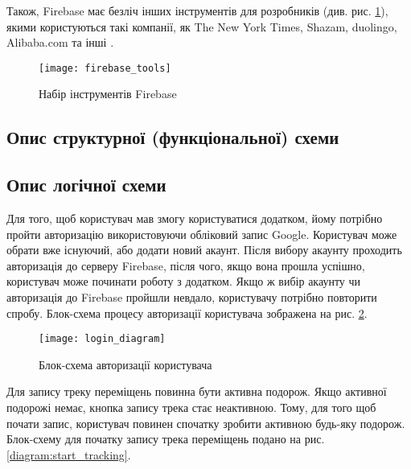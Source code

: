 \documentclass[../main.tex]{subfiles}
\begin{document}


Також, Firebase має безліч інших інструментів для розробників (див. рис. \ref{figure:firebase_tools}), якими користуються такі компанії, як The New York Times, Shazam, duolingo, Alibaba.com та інші \cite{firebase}.


\begin{figure}[H]
	\centering
	\texttt{[image: firebase\_tools]}
	\caption{Набір інструментів Firebase}
	\label{figure:firebase_tools}
\end{figure}

\subsection{Опис структурної (функціональної) схеми}


\subsection{Опис логічної схеми}


Для того, щоб користувач мав змогу користуватися додатком, йому потрібно пройти авторизацію використовуючи обліковий запис Google. Користувач може обрати вже існуючий, або додати новий акаунт. Після вибору акаунту проходить авторизація до серверу Firebase, після чого, якщо вона прошла успішно, користувач може починати роботу з додатком. Якщо ж вибір акаунту чи авторизація до Firebase пройшли невдало, користувачу потрібно повторити спробу. Блок-схема процесу авторизації користувача зображена на рис. \ref{diagram:login}.

\begin{figure}[H]
	\centering
	\texttt{[image: login\_diagram]}
	\caption{Блок-схема авторизації користувача}
	\label{diagram:login}
\end{figure}

Для запису треку переміщень повинна бути активна подорож. Якщо активної подорожі немає, кнопка запису трека стає неактивною. Тому, для того щоб почати запис, користувач повинен спочатку зробити активною будь-яку подорож. Блок-схему для початку запису трека переміщень подано на рис. \ref{diagram:start_tracking}.
\end{document}

